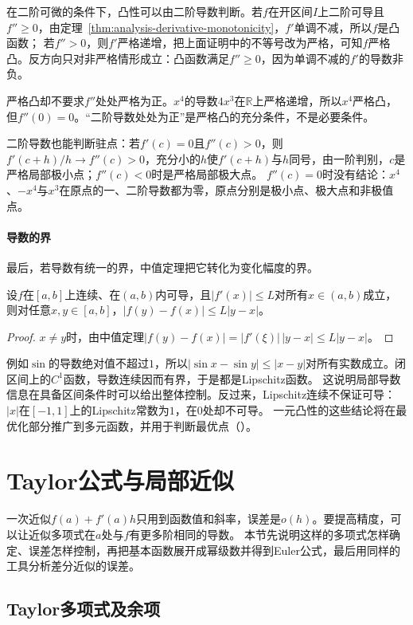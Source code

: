 在二阶可微的条件下，凸性可以由二阶导数判断。若$f$在开区间$I$上二阶可导且$f''\geq0$，由定理~\ref{thm:analysis-derivative-monotonicity}，$f'$单调不减，所以$f$是凸函数；
若$f''>0$，则$f'$严格递增，把上面证明中的不等号改为严格，可知$f$严格凸。反方向只对非严格情形成立：凸函数满足$f''\geq0$，因为单调不减的$f'$的导数非负。

严格凸却不要求$f''$处处严格为正。$x^4$的导数$4x^3$在$\mathbb R$上严格递增，所以$x^4$严格凸，但$f''(0)=0$。“二阶导数处处为正”是严格凸的充分条件，不是必要条件。

二阶导数也能判断驻点：若$f'(c)=0$且$f''(c)>0$，则$f'(c+h)/h\to f''(c)>0$，充分小的$h$使$f'(c+h)$与$h$同号，由一阶判别，$c$是严格局部极小点；$f''(c)<0$时是严格局部极大点。
$f''(c)=0$时没有结论：$x^4$、$-x^4$与$x^3$在原点的一、二阶导数都为零，原点分别是极小点、极大点和非极值点。

\paragraph{导数的界}
最后，若导数有统一的界，中值定理把它转化为变化幅度的界。
\begin{theorem}[有界导数与Lipschitz条件]
\label{thm:analysis-bounded-derivative-lipschitz}
设$f$在$[a,b]$上连续、在$(a,b)$内可导，且$|f'(x)|\leq L$对所有$x\in(a,b)$成立，则对任意$x,y\in[a,b]$，$|f(y)-f(x)|\leq L|y-x|$。
\end{theorem}
\begin{proof}
$x\neq y$时，由中值定理$|f(y)-f(x)|=|f'(\xi)|\,|y-x|\leq L|y-x|$。
\end{proof}
例如$\sin$的导数绝对值不超过$1$，所以$|\sin x-\sin y|\leq|x-y|$对所有实数成立。闭区间上的$C^1$函数，导数连续因而有界，于是都是Lipschitz函数。
这说明局部导数信息在具备区间条件时可以给出整体控制。反过来，Lipschitz连续不保证可导：$|x|$在$[-1,1]$上的Lipschitz常数为$1$，在$0$处却不可导。
一元凸性的这些结论将在最优化部分推广到多元函数，并用于判断最优点（）。
\section{Taylor公式与局部近似}
\label{sec:ru-taylor}
\label{sec:analysis-taylor-approximation}

一次近似$f(a)+f'(a)h$只用到函数值和斜率，误差是$o(h)$。要提高精度，可以让近似多项式在$a$处与$f$有更多阶相同的导数。
本节先说明这样的多项式怎样确定、误差怎样控制，再把基本函数展开成幂级数并得到Euler公式，最后用同样的工具分析差分近似的误差。

\subsection{Taylor多项式及余项}
\label{sec:ru-taylor-remainders}

